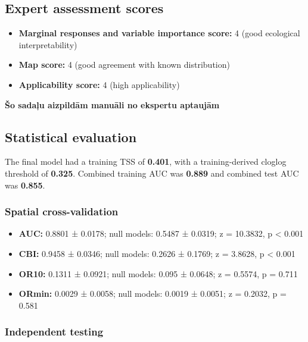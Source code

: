 \documentclass[
  openany]{book}
\providecommand{\tightlist}{%
  \setlength{\itemsep}{0pt}\setlength{\parskip}{0pt}}
\providecommand{\tightlist}{%
  \setlength{\itemsep}{0pt}%
  \setlength{\parskip}{0pt}%
}
\begin{document}
\subsection*{Expert assessment scores}\label{expert-assessment-scores-23}

\begin{itemize}
\tightlist
\item
  \textbf{Marginal responses and variable importance score:} 4 (good ecological interpretability)
\item
  \textbf{Map score:} 4 (good agreement with known distribution)
\item
  \textbf{Applicability score:} 4 (high applicability)
\end{itemize}

\textbf{Šo sadaļu aizpildām manuāli no ekspertu aptaujām}

\subsection*{Statistical evaluation}\label{statistical-evaluation-23}

The final model had a training TSS of \textbf{0.401}, with a training-derived cloglog threshold of \textbf{0.325}. Combined training AUC was \textbf{0.889} and combined test AUC was \textbf{0.855}.

\subsubsection*{Spatial cross-validation}\label{spatial-cross-validation-23}

\begin{itemize}
\tightlist
\item
  \textbf{AUC:} 0.8801 ± 0.0178; null models: 0.5487 ± 0.0319; z = 10.3832, p \textless{} 0.001
\item
  \textbf{CBI:} 0.9458 ± 0.0346; null models: 0.2626 ± 0.1769; z = 3.8628, p \textless{} 0.001
\item
  \textbf{OR10:} 0.1311 ± 0.0921; null models: 0.095 ± 0.0648; z = 0.5574, p = 0.711
\item
  \textbf{ORmin:} 0.0029 ± 0.0058; null models: 0.0019 ± 0.0051; z = 0.2032, p = 0.581
\end{itemize}

\subsubsection*{Independent testing}\label{independent-testing-23}
\end{document}
